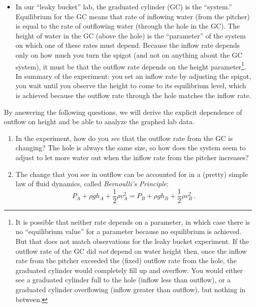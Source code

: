 \documentclass[12pt]{article}
\begin{document}
\begin{enumerate}
\begin{itemize}
	\item In our ``leaky bucket'' lab, the graduated cylinder (GC) is the ``system.'' Equilibrium for the GC means that rate of inflowing water (from the pitcher) is equal to the rate of outflowing water (through the hole in the GC). The height of water in the GC (above the hole) is the ``parameter'' of the system on which one of these rates must depend.  Because the inflow rate depends only on how much you turn the spigot (and not on anything about the GC system), it must be that the outflow rate depends on the height parameter\footnote{It is possible that neither rate depends on a parameter, in which case there is no ``equilibrium value'' for a parameter because no equilibrium is achieved.  But that does not match observations for the leaky bucket experiment.  If the outflow rate of the GC did {\em not} depend on water height then, once the inflow rate from the pitcher exceeded the (fixed) outflow rate from the hole, the graduated cylinder would completely fill up and overflow. You would either see a graduated cylinder full to the hole (inflow less than outflow), or a graduated cylinder overflowing (inflow greater than outflow), but nothing in between.}. In summary of the experiment: you set an inflow rate by adjusting the spigot, you wait until you observe the height to come to its equilibrium level, which is achieved because the outflow rate through the hole matches the inflow rate. 
	\end{itemize}
By answering the following questions, we will derive the explicit dependence of outflow on height and be able to analyze the graphed lab data.
	\begin{enumerate} 
	\item  In the experiment, how do you {\em see} that the outflow rate from the GC is changing?  The hole is always the same size, so how does the system seem to adjust to let more water out when the inflow rate from the pitcher increases?
	\item The change that you see in outflow can be accounted for in a (pretty) simple law of fluid dynamics, called {\em Bernoulli's Principle}:
		\begin{equation*}
		P_A + \rho g h_A + \frac{1}{2} \rho v_A^2 = P_B + \rho g h_B + \frac{1}{2} \rho v_B^2  \,.
		\end{equation*}

\end{enumerate}
\end{enumerate}
\end{document}
